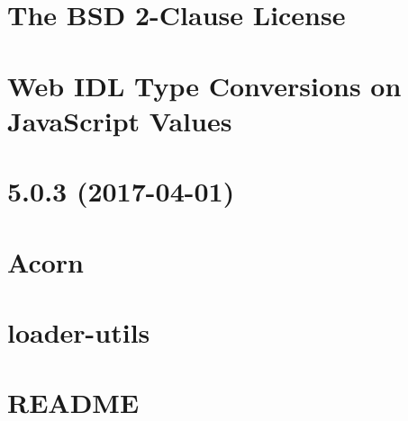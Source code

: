 \documentclass[twoside]{book}
\newcommand{\+}{\discretionary{\mbox{\scriptsize$\hookleftarrow$}}{}{}}
\begin{document}
\chapter{The B\+SD 2-\/\+Clause License}
\label{md__c_1_workspace_demo_src_main_script_node_modules_webidl-conversions__l_i_c_e_n_s_e}

\chapter{Web I\+DL Type Conversions on Java\+Script Values}
\label{md__c_1_workspace_demo_src_main_script_node_modules_webidl-conversions__r_e_a_d_m_e}

\chapter{5.0.3 (2017-\/04-\/01)}
\label{md__c_1_workspace_demo_src_main_script_node_modules_webpack_node_modules_acorn__c_h_a_n_g_e_l_o_g}

\chapter{Acorn}
\label{md__c_1_workspace_demo_src_main_script_node_modules_webpack_node_modules_acorn__r_e_a_d_m_e}

\chapter{loader-\/utils}
\label{md__c_1_workspace_demo_src_main_script_node_modules_webpack_node_modules_loader-utils__r_e_a_d_m_e}

\chapter{R\+E\+A\+D\+ME}
\label{md__c_1_workspace_demo_src_main_script_node_modules_webpack__r_e_a_d_m_e}

\end{document}
